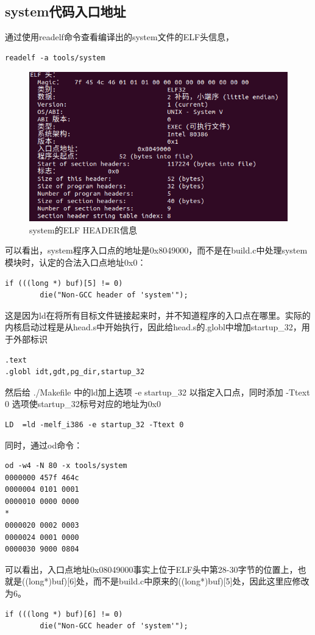 \documentclass[12pt]{article}
\begin{document}
\subsection{system代码入口地址}	
通过使用readelf命令查看编译出的system文件的ELF头信息，
\begin{lstlisting}[breaklines]
readelf -a tools/system
\end{lstlisting}
\begin{figure}[htbp]
\centering
\includegraphics[scale=0.5]{fig/30.png}
\caption{system的ELF HEADER信息}
\label{fig:system's HEADER}
\end{figure}
可以看出，system程序入口点的地址是0x8049000，而不是在build.c中处理system模块时，认定的合法入口点地址0x0：
\begin{lstlisting}[breaklines]
	if (((long *) buf)[5] != 0)
		die("Non-GCC header of 'system'");
\end{lstlisting}
这是因为ld在将所有目标文件链接起来时，并不知道程序的入口点在哪里。实际的内核启动过程是从head.s中开始执行，因此给head.s的.globl中增加startup\_32，用于外部标识
\begin{lstlisting}[breaklines]
.text
.globl idt,gdt,pg_dir,startup_32
\end{lstlisting}
然后给 ./Makefile 中的ld加上选项 -e startup\_32 以指定入口点，同时添加 -Ttext 0 选项使startup\_32标号对应的地址为0x0
\begin{lstlisting}[breaklines]
LD	=ld -melf_i386 -e startup_32 -Ttext 0
\end{lstlisting}
同时，通过od命令：
\begin{lstlisting}[breaklines]
od -w4 -N 80 -x tools/system
0000000 457f 464c
0000004 0101 0001
0000010 0000 0000
*
0000020 0002 0003
0000024 0001 0000
0000030 9000 0804
\end{lstlisting}
可以看出，入口点地址0x08049000事实上位于ELF头中第28-30字节的位置上，也就是((long*)buf)[6]处，而不是build.c中原来的((long*)buf)[5]处，因此这里应修改为6。
\begin{lstlisting}[breaklines]
	if (((long *) buf)[6] != 0)
		die("Non-GCC header of 'system'");
\end{lstlisting}
\end{document}
